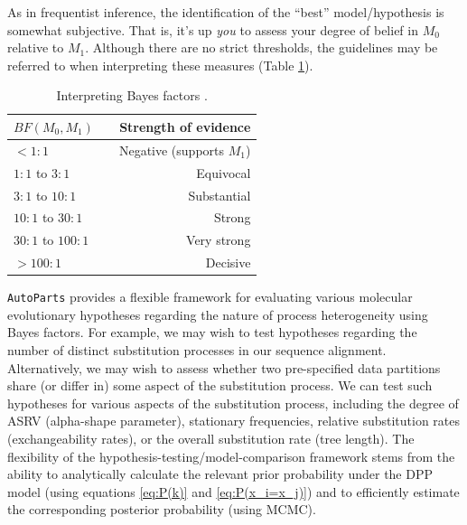 \documentclass[11pt]{article}
\begin{document}
As in frequentist inference, the identification of the ``best'' model/hypothesis is somewhat subjective.
That is, it's up \emph{you} to assess your degree of belief in $M_0$ relative to $M_1$. 
Although there are no strict thresholds, the guidelines \citep[proposed by][]{jeffreys61} may be referred to when interpreting these measures (Table \ref{bftable}).
\begin{table}[h]
\centering
\caption{\small Interpreting Bayes factors \citep{jeffreys61}.} 
\label{bftable}
\begin{tabular}{l c r}
\hline
\multicolumn{1}{l}{\textbf{$BF(M_0, M_1)$}} & \multicolumn{1}{r}{ } &\multicolumn{1}{r}{{Strength of evidence}} \\ 
\hline
$<1:1$ & \hspace{8mm} & Negative (supports $M_1$)\\
$1:1$ to $3:1$ & & Equivocal\\
$3:1$ to $10:1$ & & Substantial\\
$10:1$ to $30:1$ & & Strong\\
$30:1$ to $100:1$ & & Very strong\\
$>100:1$ & & Decisive\\
\hline
\end{tabular}
\end{table}

\verb!AutoParts! provides a flexible framework for evaluating various molecular evolutionary hypotheses regarding the nature of process heterogeneity using Bayes factors.
For example, we may wish to test hypotheses regarding the number of distinct substitution processes in our sequence alignment.
Alternatively, we may wish to assess whether two pre-specified data partitions share (or differ in) some aspect of the substitution process.  
We can test such hypotheses for various aspects of the substitution process, including the degree of ASRV (alpha-shape parameter), stationary frequencies, relative substitution rates (exchangeability rates), or the overall substitution rate (tree length).
The flexibility of the hypothesis-testing/model-comparison framework stems from the ability to analytically calculate the relevant prior probability under the DPP model (using equations \ref{eq:P(k)} and \ref{eq:P(x_i=x_j)}) and to efficiently estimate the corresponding posterior probability (using MCMC).
\end{document}
